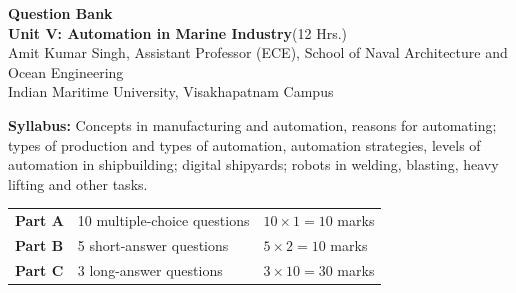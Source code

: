\documentclass[11pt,a4paper]{article}
\begin{document}
	\begin{center}
		{\Large\bfseries\color{cAccent} Question Bank}\\[4pt]
		{\large\bfseries Unit V: Automation in Marine Industry}\quad(12 Hrs.)\\[6pt]
		{\small Amit Kumar Singh, Assistant Professor (ECE), School of Naval Architecture and Ocean Engineering\\
			Indian Maritime University, Visakhapatnam Campus}
	\end{center}

	\noindent\textbf{Syllabus:} Concepts in manufacturing and automation, reasons for automating; types of production and types of automation, automation strategies, levels of automation in shipbuilding; digital shipyards; robots in welding, blasting, heavy lifting and other tasks.

	\medskip
	\noindent
	\begin{tabular}{@{}lll@{}}
		\textbf{Part A} & 10 multiple-choice questions & $10\times1 = 10$ marks \\
		\textbf{Part B} & 5 short-answer questions      & $5\times2 = 10$ marks \\
		\textbf{Part C} & 3 long-answer questions       & $3\times10 = 30$ marks \\
	\end{tabular}
\end{document}
